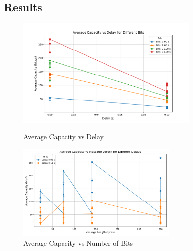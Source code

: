 \documentclass[10pt,a4paper]{article}
\begin{document}
\subsection*{Results}
\vspace{-2em}
\begin{figure}[H]
\centering
\includegraphics[width=0.8\textwidth]{capacity_vs_delay.png}
\caption{Average Capacity vs Delay}

\includegraphics[width=0.7\textwidth]{capacity_vs_length.png}
\caption{Average Capacity vs Number of Bits}
\end{figure}
\end{document}
